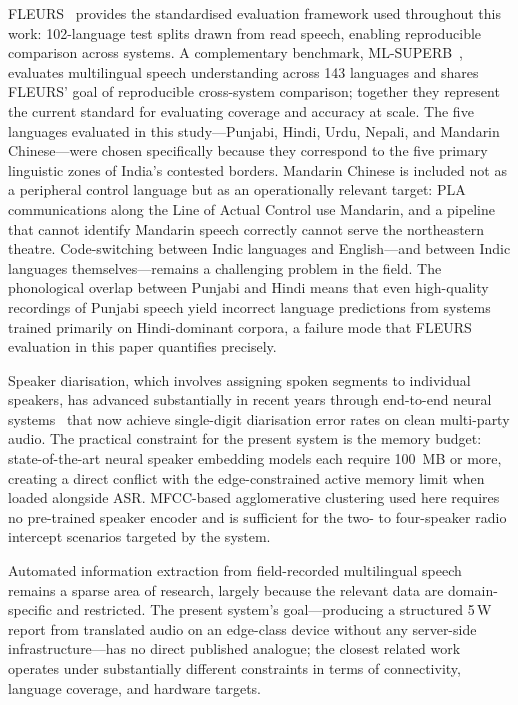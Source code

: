 \documentclass[12pt, onecolumn]{IEEEtran}
\begin{document}
FLEURS~\cite{conneau2023fleurs} provides the standardised evaluation framework used throughout this work: 102-language test splits drawn from read speech, enabling reproducible comparison across systems. A complementary benchmark, ML-SUPERB~\cite{shi2023mlsuperb}, evaluates multilingual speech understanding across 143 languages and shares FLEURS' goal of reproducible cross-system comparison; together they represent the current standard for evaluating coverage and accuracy at scale. The five languages evaluated in this study---Punjabi, Hindi, Urdu, Nepali, and Mandarin Chinese---were chosen specifically because they correspond to the five primary linguistic zones of India's contested borders. Mandarin Chinese is included not as a peripheral control language but as an operationally relevant target: PLA communications along the Line of Actual Control use Mandarin, and a pipeline that cannot identify Mandarin speech correctly cannot serve the northeastern theatre. Code-switching between Indic languages and English---and between Indic languages themselves---remains a challenging problem in the field. The phonological overlap between Punjabi and Hindi means that even high-quality recordings of Punjabi speech yield incorrect language predictions from systems trained primarily on Hindi-dominant corpora, a failure mode that FLEURS evaluation in this paper quantifies precisely.

Speaker diarisation, which involves assigning spoken segments to individual speakers, has advanced substantially in recent years through end-to-end neural systems~\cite{plaquet2023powerset} that now achieve single-digit diarisation error rates on clean multi-party audio. The practical constraint for the present system is the memory budget: state-of-the-art neural speaker embedding models each require 100~MB or more, creating a direct conflict with the edge-constrained active memory limit when loaded alongside ASR. MFCC-based agglomerative clustering used here requires no pre-trained speaker encoder and is sufficient for the two- to four-speaker radio intercept scenarios targeted by the system.

Automated information extraction from field-recorded multilingual speech remains a sparse area of research, largely because the relevant data are domain-specific and restricted. The present system's goal---producing a structured 5\,W report from translated audio on an edge-class device without any server-side infrastructure---has no direct published analogue; the closest related work operates under substantially different constraints in terms of connectivity, language coverage, and hardware targets.
\end{document}
